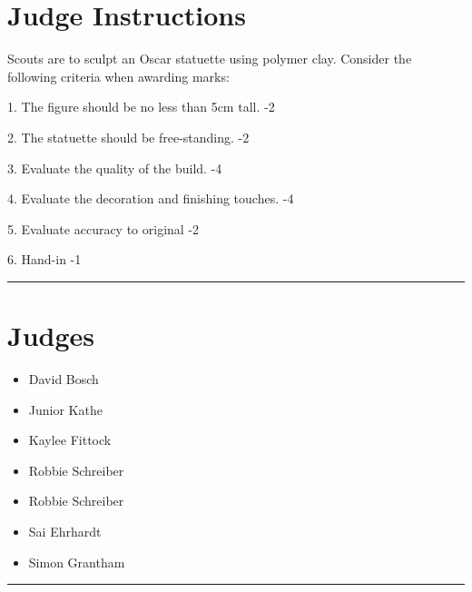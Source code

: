 \documentclass[10pt]{article}
\begin{document}
		\section*{Judge Instructions}
		Scouts are to sculpt an Oscar statuette using polymer clay. Consider the following criteria when awarding marks:



1. The figure should be no less than 5cm tall. -2

2. The statuette should be free-standing. -2

3. Evaluate the quality of the build. -4

4. Evaluate the decoration and finishing touches. -4

5. Evaluate accuracy to original -2

6. Hand-in -1


\vspace{0.5cm}
	\hrule
	\vspace{0.5cm}
		\section*{\faUsers \: Judges}

		

	\begin{multicols}{2}

		\begin{itemize}
									\item David Bosch
									\item Junior Kathe
									\item Kaylee Fittock
									\item Robbie Schreiber
						\end{itemize}

		\vfill\null
		\columnbreak

		\begin{itemize}
									\item Robbie Schreiber
									\item Sai Ehrhardt
									\item Simon Grantham
						\end{itemize}

		\vfill\null

		\end{multicols}



			\vspace{0.5cm}
	\hrule
	\vspace{0.5cm}
\end{document}
